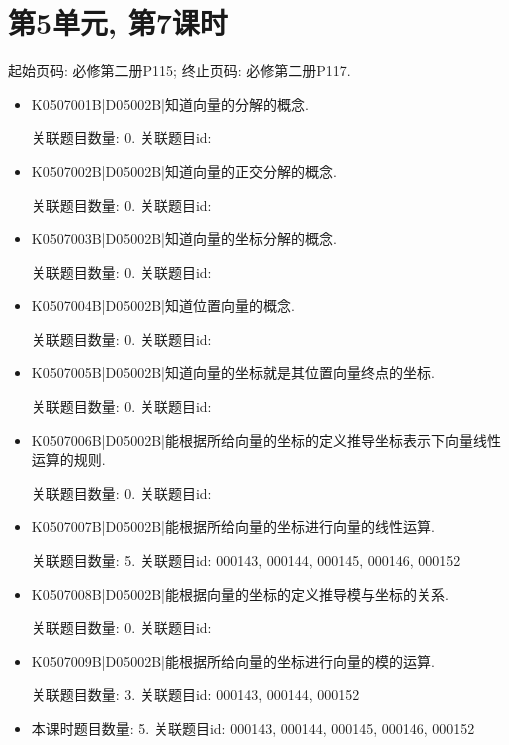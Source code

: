 \section*{第5单元, 第7课时}
起始页码: 必修第二册P115; 终止页码: 必修第二册P117.
\begin{itemize}
\item K0507001B|D05002B|知道向量的分解的概念.

关联题目数量: 0. 关联题目id: 

\item K0507002B|D05002B|知道向量的正交分解的概念.

关联题目数量: 0. 关联题目id: 

\item K0507003B|D05002B|知道向量的坐标分解的概念.

关联题目数量: 0. 关联题目id: 

\item K0507004B|D05002B|知道位置向量的概念.

关联题目数量: 0. 关联题目id: 

\item K0507005B|D05002B|知道向量的坐标就是其位置向量终点的坐标.

关联题目数量: 0. 关联题目id: 

\item K0507006B|D05002B|能根据所给向量的坐标的定义推导坐标表示下向量线性运算的规则.

关联题目数量: 0. 关联题目id: 

\item K0507007B|D05002B|能根据所给向量的坐标进行向量的线性运算.

关联题目数量: 5. 关联题目id: 000143, 000144, 000145, 000146, 000152

\item K0507008B|D05002B|能根据向量的坐标的定义推导模与坐标的关系.

关联题目数量: 0. 关联题目id: 

\item K0507009B|D05002B|能根据所给向量的坐标进行向量的模的运算.

关联题目数量: 3. 关联题目id: 000143, 000144, 000152

\item 本课时题目数量: 5. 关联题目id: 000143, 000144, 000145, 000146, 000152

\end{itemize}

